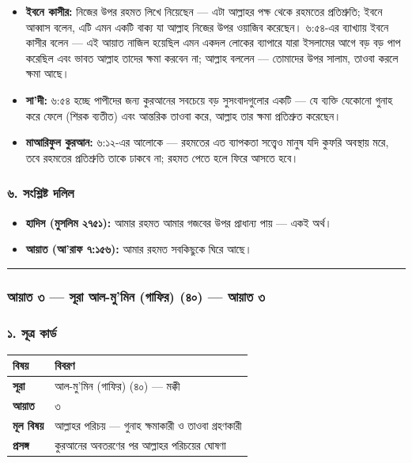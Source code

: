 \begin{itemize}
\item \textbf{ইবনে কাসীর:} নিজের উপর রহমত লিখে নিয়েছেন — এটা আল্লাহর পক্ষ থেকে রহমতের প্রতিশ্রুতি; ইবনে আব্বাস বলেন, এটি এমন একটি বাক্য যা আল্লাহ নিজের উপর ওয়াজিব করেছেন। ৬:৫৪-এর ব্যাখ্যায় ইবনে কাসীর বলেন — এই আয়াত নাজিল হয়েছিল এমন একদল লোকের ব্যাপারে যারা ইসলামের আগে বড় বড় পাপ করেছিল এবং ভাবত আল্লাহ তাদের ক্ষমা করবেন না; আল্লাহ বললেন — তোমাদের উপর সালাম, তাওবা করলে ক্ষমা আছে।
\item \textbf{সা'দী:} ৬:৫৪ হচ্ছে পাপীদের জন্য কুরআনের সবচেয়ে বড় সুসংবাদগুলোর একটি — যে ব্যক্তি যেকোনো গুনাহ করে ফেলে (শিরক ব্যতীত) এবং আন্তরিক তাওবা করে, আল্লাহ তার ক্ষমা প্রতিশ্রুত করেছেন।
\item \textbf{মাআরিফুল কুরআন:} ৬:১২-এর আলোকে — রহমতের এত ব্যাপকতা সত্ত্বেও মানুষ যদি কুফরি অবস্থায় মরে, তবে রহমতের প্রতিশ্রুতি তাকে ঢাকবে না; রহমত পেতে হলে ফিরে আসতে হবে।
\end{itemize}
\subsubsection*{৬. সংশ্লিষ্ট দলিল}

\begin{itemize}
\item \textbf{হাদিস (মুসলিম ২৭৫১):} আমার রহমত আমার গজবের উপর প্রাধান্য পায় — একই অর্থ।
\item \textbf{আয়াত (আ'রাফ ৭:১৫৬):} আমার রহমত সবকিছুকে ঘিরে আছে।
\end{itemize}
\medskip\hrule\medskip

\subsubsection*{আয়াত ৩ — সূরা আল-মু'মিন (গাফির) (৪০) — আয়াত ৩}

\subsubsection*{১. সূত্র কার্ড}

\begin{table}[h]\centering\small
\begin{tabular}{ll}
বিষয় & বিবরণ \\
\hline
\textbf{সূরা} & আল-মু'মিন (গাফির) (৪০) — মক্কী \\
\textbf{আয়াত} & ৩ \\
\textbf{মূল বিষয়} & আল্লাহর পরিচয় — গুনাহ ক্ষমাকারী ও তাওবা গ্রহণকারী \\
\textbf{প্রসঙ্গ} & কুরআনের অবতরণের পর আল্লাহর পরিচয়ের ঘোষণা \\
\hline
\end{tabular}
\end{table}

